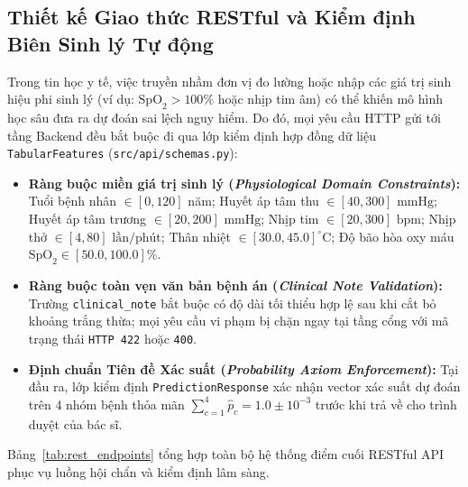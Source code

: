 \subsection{Thiết kế Giao thức RESTful và Kiểm định Biên Sinh lý Tự động}
Trong tin học y tế, việc truyền nhầm đơn vị đo lường hoặc nhập các giá trị sinh hiệu phi sinh lý (ví dụ: $\text{SpO}_2 > 100\%$ hoặc nhịp tim âm) có thể khiến mô hình học sâu đưa ra dự đoán sai lệch nguy hiểm. Do đó, mọi yêu cầu HTTP gửi tới tầng Backend đều bắt buộc đi qua lớp kiểm định hợp đồng dữ liệu \texttt{TabularFeatures} (\texttt{src/api/schemas.py}):
\begin{itemize}[leftmargin=1.8em, itemsep=0.2em]
    \item \textbf{Ràng buộc miền giá trị sinh lý (\textit{Physiological Domain Constraints}):} Tuổi bệnh nhân $\in [0, 120]$ năm; Huyết áp tâm thu $\in [40, 300]\text{ mmHg}$; Huyết áp tâm trương $\in [20, 200]\text{ mmHg}$; Nhịp tim $\in [20, 300]\text{ bpm}$; Nhịp thở $\in [4, 80]\text{ lần/phút}$; Thân nhiệt $\in [30.0, 45.0]^\circ\text{C}$; Độ bão hòa oxy máu $\text{SpO}_2 \in [50.0, 100.0]\%$.
    \item \textbf{Ràng buộc toàn vẹn văn bản bệnh án (\textit{Clinical Note Validation}):} Trường \texttt{clinical\_note} bắt buộc có độ dài tối thiểu hợp lệ sau khi cắt bỏ khoảng trắng thừa; mọi yêu cầu vi phạm bị chặn ngay tại tầng cổng với mã trạng thái \texttt{HTTP 422} hoặc \texttt{400}.
    \item \textbf{Định chuẩn Tiên đề Xác suất (\textit{Probability Axiom Enforcement}):} Tại đầu ra, lớp kiểm định \texttt{PredictionResponse} xác nhận vector xác suất dự đoán trên 4 nhóm bệnh thỏa mãn $\sum_{c=1}^{4} \hat{p}_c = 1.0 \pm 10^{-3}$ trước khi trả về cho trình duyệt của bác sĩ.
\end{itemize}

Bảng~\ref{tab:rest_endpoints} tổng hợp toàn bộ hệ thống điểm cuối RESTful API phục vụ luồng hội chẩn và kiểm định lâm sàng.

